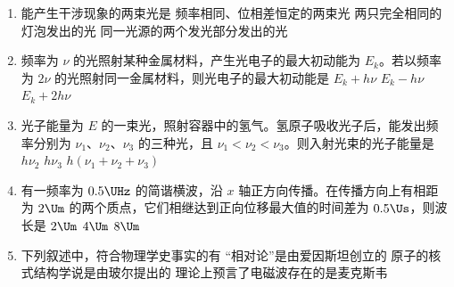 \documentclass[\gkver]{gaokaozhenti}
\begin{document}
\begin{enumerate}

\item
能产生干涉现象的两束光是
{频率相同、位相差恒定的两束光}
{两只完全相同的灯泡发出的光}
{同一光源的两个发光部分发出的光}


\item
频率为 $\nu$ 的光照射某种金属材料，产生光电子的最大初动能为 $E_{k}$。若以频率为 $2\nu$ 的光照射同一金属材料，则光电子的最大初动能是
{$E_{k}+h\nu$}
{$E_{k}-h\nu$}
{$E_{k}+2h\nu$}


\item
光子能量为 $E$ 的一束光，照射容器中的氢气。氢原子吸收光子后，能发出频率分别为 $\nu_{1}$、$\nu_{2}$、$\nu_{3}$ 的三种光，且 $\nu_{1}<\nu_{2}<\nu_{3}$。则入射光束的光子能量是
{$h\nu_{2}$}
{$h\nu_{3}$}
{$h(\nu_{1}+\nu_{2}+\nu_{3})$}


\item
有一频率为 $0.5\UHz$ 的简谐横波，沿 $x$ 轴正方向传播。在传播方向上有相距为 $2\Um$ 的两个质点，它们相继达到正向位移最大值的时间差为 $0.5\Us$，则波长是
\fourchoices[answer=D]
{$1\Um$}
{$2\Um$}
{$4\Um$}
{$8\Um$}


\item
下列叙述中，符合物理学史事实的有
{“相对论”是由爱因斯坦创立的}
{原子的核式结构学说是由玻尔提出的}
{理论上预言了电磁波存在的是麦克斯韦}


\end{enumerate}
\end{document}
